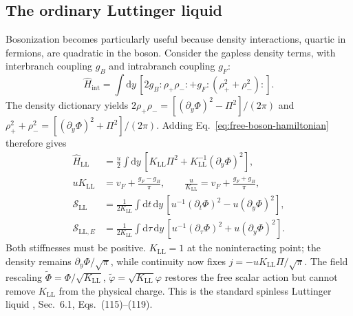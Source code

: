 \documentclass[aps,prb,onecolumn,nofootinbib,superscriptaddress]{revtex4-2}
\newcommand{\dd}{\mathrm{d}}
\begin{document}
\subsection{The ordinary Luttinger liquid}
Bosonization becomes particularly useful because density interactions,
quartic in fermions, are quadratic in the boson. Consider the gapless
density terms, with interbranch coupling $g_B$ and intrabranch coupling $g_F$:
\begin{equation}
 \hat H_{\mathrm{int}}=\int\dd y\,
       [2g_B:\!\rho_+\rho_-\!:
                +g_F:\!(\rho_+^2+\rho_-^2)\!:].
 \label{eq:density-interactions}
\end{equation}
The density dictionary yields
$2\rho_+\rho_-=[(\partial_y\Phi)^2-\Pi^2]/(2\pi)$ and
$\rho_+^2+\rho_-^2=[(\partial_y\Phi)^2+\Pi^2]/(2\pi)$.
Adding Eq.~\eqref{eq:free-boson-hamiltonian} therefore gives
\begin{align}
 \hat H_{\mathrm{LL}}
 &=\frac{u}{2}\int\dd y\,
       [K_{\mathrm{LL}}\Pi^2+K_{\mathrm{LL}}^{-1}(\partial_y\Phi)^2],
 \label{eq:ll-hamiltonian}\\
 uK_{\mathrm{LL}}&=v_F+\frac{g_F-g_B}{\pi},\qquad
 \frac{u}{K_{\mathrm{LL}}}=v_F+\frac{g_F+g_B}{\pi},
 \label{eq:ll-parameters}\\
 \mathcal S_{\mathrm{LL}}
 &=\frac{1}{2K_{\mathrm{LL}}}\int\dd t\,\dd y\,
       [u^{-1}(\partial_t\Phi)^2-u(\partial_y\Phi)^2],\nonumber\\
 \mathcal S_{\mathrm{LL},E}
 &=\frac{1}{2K_{\mathrm{LL}}}\int\dd\tau\,\dd y\,
       [u^{-1}(\partial_\tau\Phi)^2+u(\partial_y\Phi)^2].
 \label{eq:ll-actions}
\end{align}
Both stiffnesses must be positive. $K_{\mathrm{LL}}=1$ at the
noninteracting point; the density remains $\partial_y\Phi/\sqrt\pi$,
while continuity now fixes $j=-uK_{\mathrm{LL}}\Pi/\sqrt\pi$.
The field rescaling $\widetilde\Phi=\Phi/\sqrt{K_{\mathrm{LL}}}$,
$\widetilde\varphi=\sqrt{K_{\mathrm{LL}}}\varphi$ restores the free
scalar action but cannot remove $K_{\mathrm{LL}}$ from the physical
charge. This is the standard spinless Luttinger liquid
\cite{Senechal1999}, Sec.~6.1, Eqs.~(115)--(119).
\end{document}
